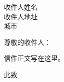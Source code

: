 \documentclass{letter}
\begin{document}
\begin{letter}{收件人姓名 \\ 收件人地址 \\ 城市}
\opening{尊敬的收件人：}

信件正文写在这里。

\closing{此致}

\end{letter}
\end{document}
